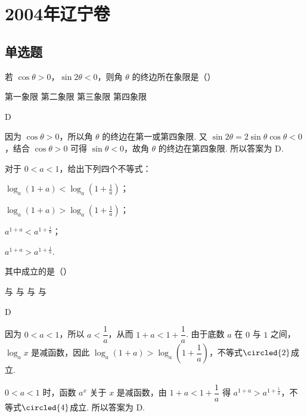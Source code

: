 \chapter{2004年辽宁卷}
\section{单选题}
\begin{problem}
若 \(\cos \theta > 0\)，\(\sin 2\theta < 0\)，则角 \(\theta\) 的终边所在象限是（\quad）

\choices
    {第一象限}
    {第二象限}
    {第三象限}
    {第四象限}
\end{problem}

\begin{answer}D\end{answer}

\begin{solution}
因为 \(\cos\theta>0\)，所以角 \(\theta\) 的终边在第一或第四象限. 又 \(\sin2\theta=2\sin\theta\cos\theta<0\)，结合 \(\cos\theta>0\) 可得 \(\sin\theta<0\)，故角 \(\theta\) 的终边在第四象限. 所以答案为 D.
\end{solution}

\begin{problem}
对于 \(0 < a < 1\)，给出下列四个不等式：

\begin{circlelist}
\item \(\log_a(1 + a) < \log_a\left(1 + \frac{1}{a}\right)\)；
\item \(\log_a(1 + a) > \log_a\left(1 + \frac{1}{a}\right)\)；
\item \(a^{1 + a} < a^{1 + \frac{1}{a}}\)；
\item \(a^{1 + a} > a^{1 + \frac{1}{a}}\).
\end{circlelist}

其中成立的是（\quad）

\choices
    {与}
    {与}
    {与}
    {与}
\end{problem}

\begin{answer}D\end{answer}

\begin{solution}
因为 \(0<a<1\)，所以 \(a<\dfrac{1}{a}\)，从而 \(1+a<1+\dfrac{1}{a}\). 由于底数 \(a\) 在 \(0\) 与 \(1\) 之间，\(\log_a x\) 是减函数，因此
\(\log_a(1+a)>\log_a\left(1+\dfrac{1}{a}\right)\)，不等式\(\circled{2}\)成立.

\(0<a<1\) 时，函数 \(a^x\) 关于 \(x\) 是减函数，由 \(1+a<1+\dfrac{1}{a}\) 得
\(a^{1+a}>a^{1+\frac{1}{a}}\)，不等式\(\circled{4}\)成立. 所以答案为 D.
\end{solution}

